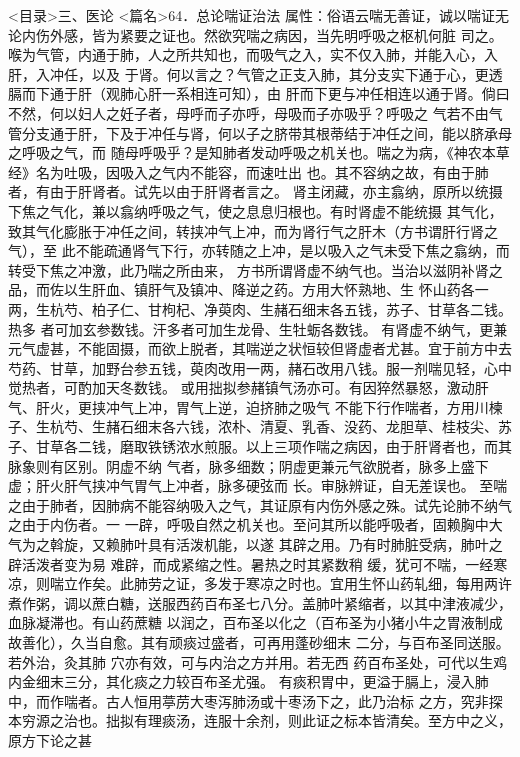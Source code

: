 \documentclass[a4paper,12pt,UTF8,twoside]{ctexbook}
\begin{document}
<目录>三、医论
<篇名>64．总论喘证治法
属性：俗语云喘无善证，诚以喘证无论内伤外感，皆为紧要之证也。然欲究喘之病因，当先明呼吸之枢机何脏 
司之。喉为气管，内通于肺，人之所共知也，而吸气之入，实不仅入肺，并能入心，入肝，入冲任，以及 
于肾。何以言之？气管之正支入肺，其分支实下通于心，更透膈而下通于肝（观肺心肝一系相连可知），由 
肝而下更与冲任相连以通于肾。倘曰不然，何以妇人之妊子者，母呼而子亦呼，母吸而子亦吸乎？呼吸之 
气若不由气管分支通于肝，下及于冲任与肾，何以子之脐带其根蒂结于冲任之间，能以脐承母之呼吸之气，而 
随母呼吸乎？是知肺者发动呼吸之机关也。喘之为病，《神农本草经》名为吐吸，因吸入之气内不能容，而速吐出 
也。其不容纳之故，有由于肺者，有由于肝肾者。试先以由于肝肾者言之。 
肾主闭藏，亦主翕纳，原所以统摄下焦之气化，兼以翕纳呼吸之气，使之息息归根也。有时肾虚不能统摄 
其气化，致其气化膨胀于冲任之间，转挟冲气上冲，而为肾行气之肝木（方书谓肝行肾之气），至 
此不能疏通肾气下行，亦转随之上冲，是以吸入之气未受下焦之翕纳，而转受下焦之冲激，此乃喘之所由来， 
方书所谓肾虚不纳气也。当治以滋阴补肾之品，而佐以生肝血、镇肝气及镇冲、降逆之药。方用大怀熟地、生 
怀山药各一两，生杭芍、柏子仁、甘枸杞、净萸肉、生赭石细末各五钱，苏子、甘草各二钱。热多 
者可加玄参数钱。汗多者可加生龙骨、生牡蛎各数钱。 
有肾虚不纳气，更兼元气虚甚，不能固摄，而欲上脱者，其喘逆之状恒较但肾虚者尤甚。宜于前方中去 
芍药、甘草，加野台参五钱，萸肉改用一两，赭石改用八钱。服一剂喘见轻，心中觉热者，可酌加天冬数钱。 
或用拙拟参赭镇气汤亦可。有因猝然暴怒，激动肝气、肝火，更挟冲气上冲，胃气上逆，迫挤肺之吸气 
不能下行作喘者，方用川楝子、生杭芍、生赭石细末各六钱，浓朴、清夏、乳香、没药、龙胆草、桂枝尖、苏 
子、甘草各二钱，磨取铁锈浓水煎服。以上三项作喘之病因，由于肝肾者也，而其脉象则有区别。阴虚不纳 
气者，脉多细数；阴虚更兼元气欲脱者，脉多上盛下虚；肝火肝气挟冲气胃气上冲者，脉多硬弦而 
长。审脉辨证，自无差误也。 
至喘之由于肺者，因肺病不能容纳吸入之气，其证原有内伤外感之殊。试先论肺不纳气之由于内伤者。一 
一辟，呼吸自然之机关也。至问其所以能呼吸者，固赖胸中大气为之斡旋，又赖肺叶具有活泼机能，以遂 
其辟之用。乃有时肺脏受病，肺叶之 辟活泼者变为易 难辟，而成紧缩之性。暑热之时其紧数稍 
缓，犹可不喘，一经寒凉，则喘立作矣。此肺劳之证，多发于寒凉之时也。宜用生怀山药轧细，每用两许 
煮作粥，调以蔗白糖，送服西药百布圣七八分。盖肺叶紧缩者，以其中津液减少，血脉凝滞也。有山药蔗糖 
以润之，百布圣以化之（百布圣为小猪小牛之胃液制成故善化），久当自愈。其有顽痰过盛者，可再用蓬砂细末 
二分，与百布圣同送服。若外治，灸其肺 穴亦有效，可与内治之方并用。若无西 
药百布圣处，可代以生鸡内金细末三分，其化痰之力较百布圣尤强。 
有痰积胃中，更溢于膈上，浸入肺中，而作喘者。古人恒用葶苈大枣泻肺汤或十枣汤下之，此乃治标 
之方，究非探本穷源之治也。拙拟有理痰汤，连服十余剂，则此证之标本皆清矣。至方中之义，原方下论之甚 
\end{document}
